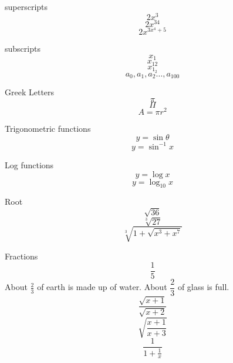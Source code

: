 \documentclass[11pt]{article}
\begin{document}
superscripts $$2x^3$$
$$2x^{34}$$
$$2x^{3x^4+5}$$


subscripts $$x_1$$
$$x_{12}$$
$$x_{1_2}$$
$$a_0,a_1,a_2 \ldots ,a_{100}$$


Greek Letters $$\pi$$
$$\Pi$$
$$ A = \pi r^2$$


Trigonometric functions
$$ y = \sin \theta$$
$$ y = \sin ^{-1} x$$

Log functions
$$ y = \log x$$
$$ y = \log_{10} x$$

Root
$$\sqrt{36}$$
$$\sqrt[3]{27}$$
$$\sqrt[3]{1+\sqrt{x^3 + x^7}}$$

Fractions
$$\frac{1}{5}$$	
About $\frac{2}{3}$ of earth is made up of water.
About $\dfrac{2}{3}$ of glass is full.
$$\frac{\sqrt{x+1}}{\sqrt{x+2}}$$
$$\sqrt{\frac{x+1}{x+3}}$$
$$\frac{1}{ 1+\frac{1}{x} }$$
\end{document}
